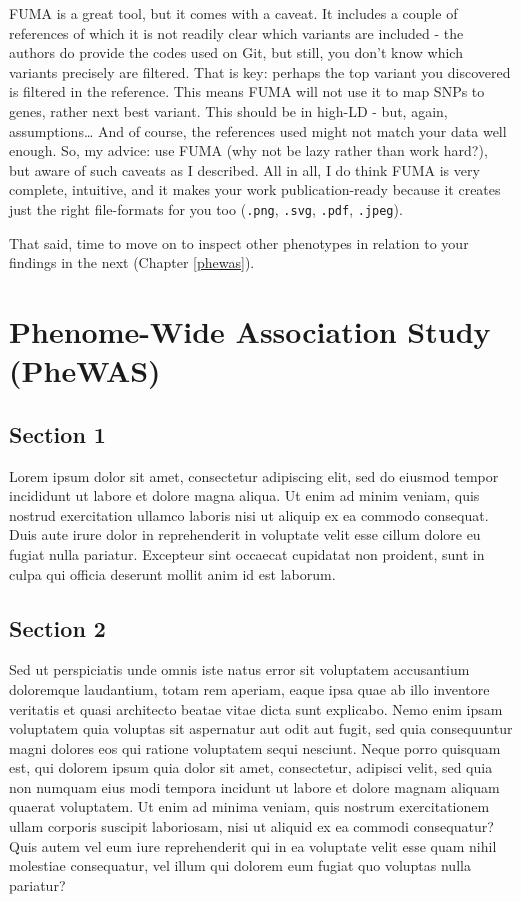 \documentclass[
]{book}
\begin{document}
FUMA is a great tool, but it comes with a caveat. It includes a couple of references of which it is not readily clear which variants are included - the authors do provide the codes used on Git, but still, you don't know which variants precisely are filtered. That is key: perhaps the top variant you discovered is filtered in the reference. This means FUMA will not use it to map SNPs to genes, rather next best variant. This should be in high-LD - but, again, assumptions\ldots{} And of course, the references used might not match your data well enough. So, my advice: use FUMA (why not be lazy rather than work hard?), but aware of such caveats as I described. All in all, I do think FUMA is very complete, intuitive, and it makes your work publication-ready because it creates just the right file-formats for you too (\texttt{.png}, \texttt{.svg}, \texttt{.pdf}, \texttt{.jpeg}).

That said, time to move on to inspect other phenotypes in relation to your findings in the next (Chapter \ref{phewas}).

\hypertarget{phenome-wide-association-study-phewas}{%
\chapter{Phenome-Wide Association Study (PheWAS)}\label{phenome-wide-association-study-phewas}}

\hypertarget{section-1-2}{%
\section{Section 1}\label{section-1-2}}

Lorem ipsum dolor sit amet, consectetur adipiscing elit, sed do eiusmod tempor incididunt ut labore et dolore magna aliqua. Ut enim ad minim veniam, quis nostrud exercitation ullamco laboris nisi ut aliquip ex ea commodo consequat. Duis aute irure dolor in reprehenderit in voluptate velit esse cillum dolore eu fugiat nulla pariatur. Excepteur sint occaecat cupidatat non proident, sunt in culpa qui officia deserunt mollit anim id est laborum.

\hypertarget{section-2-2}{%
\section{Section 2}\label{section-2-2}}

Sed ut perspiciatis unde omnis iste natus error sit voluptatem accusantium doloremque laudantium, totam rem aperiam, eaque ipsa quae ab illo inventore veritatis et quasi architecto beatae vitae dicta sunt explicabo. Nemo enim ipsam voluptatem quia voluptas sit aspernatur aut odit aut fugit, sed quia consequuntur magni dolores eos qui ratione voluptatem sequi nesciunt. Neque porro quisquam est, qui dolorem ipsum quia dolor sit amet, consectetur, adipisci velit, sed quia non numquam eius modi tempora incidunt ut labore et dolore magnam aliquam quaerat voluptatem. Ut enim ad minima veniam, quis nostrum exercitationem ullam corporis suscipit laboriosam, nisi ut aliquid ex ea commodi consequatur? Quis autem vel eum iure reprehenderit qui in ea voluptate velit esse quam nihil molestiae consequatur, vel illum qui dolorem eum fugiat quo voluptas nulla pariatur?
\end{document}
